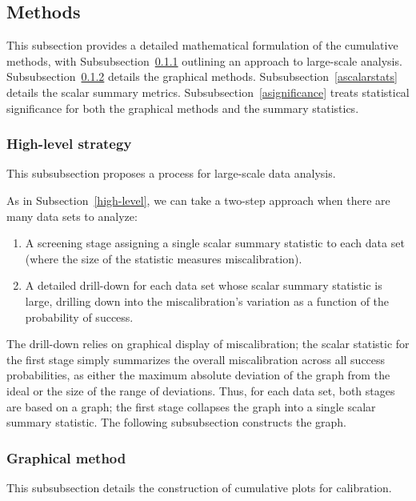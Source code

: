 \documentclass{article}
\begin{document}
\subsection{Methods}
\label{amethods}

This subsection provides a detailed mathematical formulation
of the cumulative methods,
with Subsubsection~\ref{ahigh-level} outlining an approach
to large-scale analysis.
Subsubsection~\ref{agraphical} details the graphical methods.
Subsubsection~\ref{ascalarstats} details the scalar summary metrics.
Subsubsection~\ref{asignificance} treats statistical significance
for both the graphical methods and the summary statistics.


\subsubsection{High-level strategy}
\label{ahigh-level}

This subsubsection proposes a process for large-scale data analysis.

As in Subsection~\ref{high-level}, we can take a two-step approach
when there are many data sets to analyze:
%
\begin{enumerate}
\item A screening stage assigning a single scalar summary statistic
to each data set (where the size of the statistic measures miscalibration).
\item A detailed drill-down for each data set
whose scalar summary statistic is large, drilling down into
the miscalibration's variation as a function of the probability of success.
\end{enumerate}

The drill-down relies on graphical display of miscalibration;
the scalar statistic for the first stage simply summarizes
the overall miscalibration across all success probabilities,
as either the maximum absolute deviation of the graph from the ideal
or the size of the range of deviations.
Thus, for each data set, both stages are based on a graph;
the first stage collapses the graph into a single scalar summary statistic.
The following subsubsection constructs the graph.


\subsubsection{Graphical method}
\label{agraphical}

This subsubsection details the construction of cumulative plots
for calibration.
\end{document}
